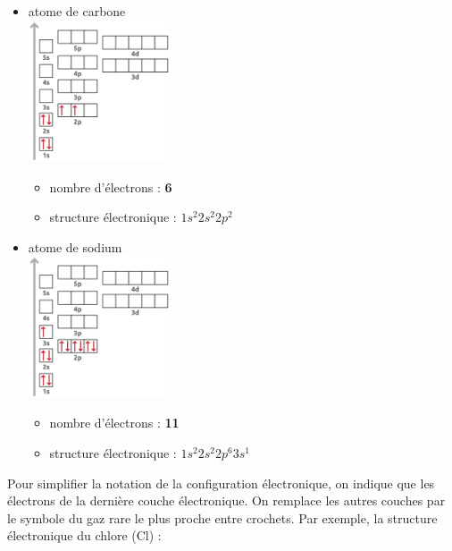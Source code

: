 \documentclass[
  11pt,
  a4paper,
  openany]{book}
\providecommand{\tightlist}{%
  \setlength{\itemsep}{0pt}\setlength{\parskip}{0pt}}
\begin{document}
\begin{Answer}

\begin{itemize}
\tightlist
\item
  atome de carbone\\
  \includegraphics[width=0.33\textwidth,height=\textheight]{images/energy-level-2-2.png}

  \begin{itemize}
  \tightlist
  \item
    nombre d'électrons : \textbf{6}
  \item
    structure électronique : \(1s^2 2s^2 2p^2\)
  \end{itemize}
\item
  atome de sodium\\
  \includegraphics[width=0.33\textwidth,height=\textheight]{images/energy-level-2-3.png}

  \begin{itemize}
  \tightlist
  \item
    nombre d'électrons : \textbf{11}
  \item
    structure électronique : \(1s^2 2s^2 2p^6 3s^1\)
  \end{itemize}
\end{itemize}

\end{Answer}

Pour simplifier la notation de la configuration électronique, on indique que les électrons de la dernière couche électronique. On remplace les autres couches par le symbole du gaz rare le plus proche entre crochets. Par exemple, la structure électronique du chlore (Cl) :
\end{document}

